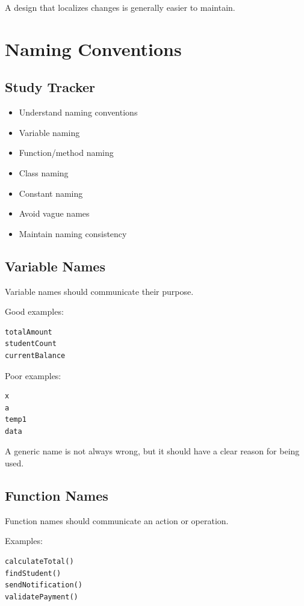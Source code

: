 \documentclass[11pt,a4paper]{article}
\newcommand{\checkitem}{$\square$}
\begin{document}
A design that localizes changes is generally easier to maintain.

\section{Naming Conventions}

\subsection{Study Tracker}

\begin{itemize}[label=\checkitem]
    \item Understand naming conventions
    \item Variable naming
    \item Function/method naming
    \item Class naming
    \item Constant naming
    \item Avoid vague names
    \item Maintain naming consistency
\end{itemize}

\subsection{Variable Names}

Variable names should communicate their purpose.

Good examples:

\begin{verbatim}
totalAmount
studentCount
currentBalance
\end{verbatim}

Poor examples:

\begin{verbatim}
x
a
temp1
data
\end{verbatim}

A generic name is not always wrong, but it should have a clear reason for
being used.

\subsection{Function Names}

Function names should communicate an action or operation.

Examples:

\begin{verbatim}
calculateTotal()
findStudent()
sendNotification()
validatePayment()
\end{verbatim}
\end{document}
